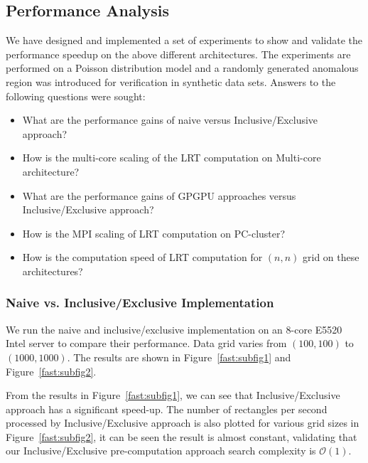 \documentclass[AMA,LATO1COL]{WileyNJD-v2}
\newcommand\bigo{\mathcal O}
\begin{document}
\subsection{Performance Analysis}
We have designed and implemented a set of experiments to show and validate the performance speedup on the above different architectures. The experiments are performed on a Poisson distribution model and a randomly generated anomalous region was introduced
for verification in synthetic data sets. Answers to the following questions were sought:
\begin{itemize}
\item What are the performance gains of naive versus Inclusive/Exclusive
 approach?
\item How is the multi-core scaling of the LRT computation on Multi-core architecture?
\item What are the performance gains of GPGPU approaches versus Inclusive/Exclusive approach?
\item How is the MPI scaling of LRT computation on PC-cluster?
\item How is the computation speed of LRT computation for $(n,n)$ grid on these architectures?
\end{itemize}

\subsubsection{Naive vs. Inclusive/Exclusive Implementation}
 We run the naive and inclusive/exclusive implementation on an 8-core E5520 Intel server to compare their performance. Data grid varies from $(100,100)$ to $(1000,1000)$. The results are shown in Figure~\ref{fast:subfig1} and Figure~\ref{fast:subfig2}.\\

From the results in Figure~\ref{fast:subfig1}, we can see that Inclusive/Exclusive approach has a significant speed-up. The number of rectangles per second processed by Inclusive/Exclusive approach is also plotted for various grid sizes in Figure~\ref{fast:subfig2}, it can be seen the result is almost constant, validating that our Inclusive/Exclusive pre-computation approach search complexity is $\bigo (1)$.
\end{document}
